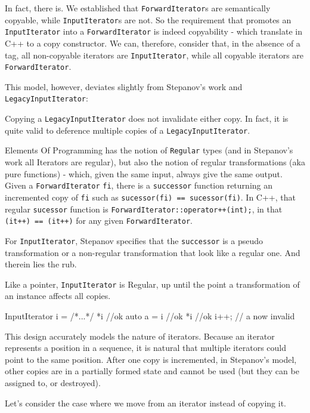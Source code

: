 \documentclass{wg21}
\begin{document}
In fact, there is. We established that \texttt{ForwardIterator}s are
semantically copyable, while \texttt{InputIterator}s are not. So the
requirement that promotes an \texttt{InputIterator} into a
\texttt{ForwardIterator} is indeed copyability - which translate in C++
to a copy constructor. We can, therefore, consider that, in the absence
of a tag, all non-copyable iterators are \texttt{InputIterator}, while
all copyable iterators are \texttt{ForwardIterator}.

This model, however, deviates slightly from Stepanov's work and
\texttt{LegacyInputIterator}: 

Copying a \texttt{LegacyInputIterator}
does not invalidate either copy. In fact, it is quite valid to deference
multiple copies of a \texttt{LegacyInputIterator}.

Elements Of Programming has the notion of \texttt{Regular} types (and in
Stepanov's work all Iterators are regular), but also the notion of
regular transformations (aka pure functions) - which, given the same
input, always give the same output. Given a \texttt{ForwardIterator}
\texttt{fi}, there is a \texttt{successor} function returning an
incremented copy of \texttt{fi} such as
\texttt{sucessor(fi)\ ==\ sucessor(fi)}. In C++, that regular
\texttt{sucessor} function is
\texttt{ForwardIterator::operator++(int);}, in that
\texttt{(it++)\ ==\ (it++)} for any given \texttt{ForwardIterator}.

For \texttt{InputIterator}, Stepanov specifies that the
\texttt{successor} is a pseudo transformation or a non-regular
transformation that look like a regular one. And therein lies the rub.

Like a pointer, \texttt{InputIterator} is Regular, up until the point a
transformation of an instance affects all copies.

\begin{codeblock}
	InputIterator i = /*...*/
	*i    //ok
	auto a = i //ok
	*i    //ok
	i++;  // a now invalid
\end{codeblock}

This design accurately models the nature of iterators. Because an
iterator represents a position in a sequence, it is natural that
multiple iterators could point to the same position. After one copy is
incremented, in Stepanov's model, other copies are in a partially formed
state and cannot be used (but they can be assigned to, or destroyed).

Let's consider the case where we move from an iterator instead of
copying it.
\end{document}
